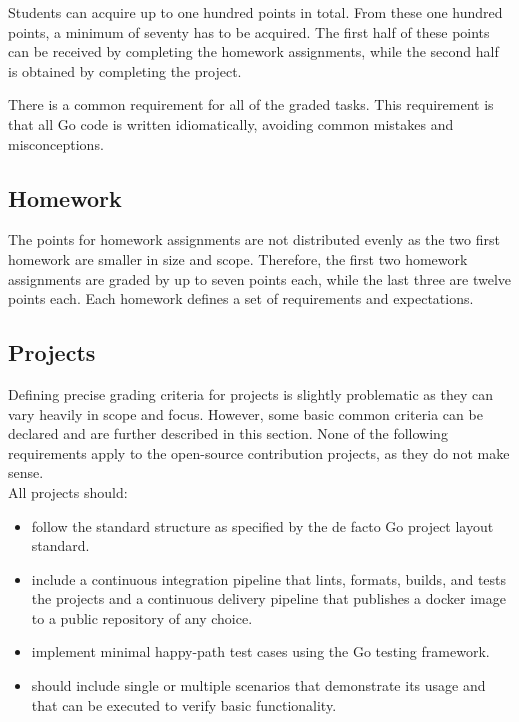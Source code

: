 \documentclass[
  digital,
  color,
  oneside,
  nosansbold,
  nocolorbold,
  nolof,
  nolot,
]{fithesis4}
\begin{document}
Students can acquire up to one hundred points in total. From these one hundred points, a minimum of seventy has to be acquired. The first half of these points can be received by completing the homework assignments, while the second half is obtained by completing the project.

There is a common requirement for all of the graded tasks. This requirement is that all Go code is written idiomatically, avoiding common mistakes and misconceptions.

\subsection{Homework}

The points for homework assignments are not distributed evenly as the two first homework are smaller in size and scope. Therefore, the first two homework assignments are graded by up to seven points each, while the last three are twelve points each. Each homework defines a set of requirements and expectations.

\subsection{Projects}

Defining precise grading criteria for projects is slightly problematic as they can vary heavily in scope and focus. However, some basic common criteria can be declared and are further described in this section. None of the following requirements apply to the open-source contribution projects, as they do not make sense. \\

\noindent
All projects should:
\begin{itemize}
    \item follow the standard structure as specified by the de facto Go project layout standard\cite{go-project-layout}.
    \item include a continuous integration pipeline that lints, formats, builds, and tests the projects and a continuous delivery pipeline that publishes a docker image to a public repository of any choice.
    \item implement minimal happy-path test cases using the Go testing framework.
    \item should include single or multiple scenarios that demonstrate its usage and that can be executed to verify basic functionality.
\end{itemize}
\end{document}
